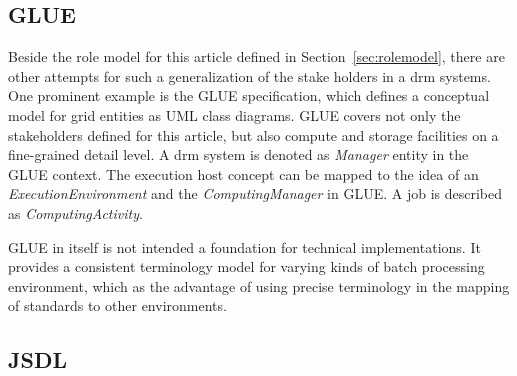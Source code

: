 \documentclass[twocolumn]{svjour3}       %
\begin{document}

% 
%
%



\subsection{GLUE}

Beside the role model for this article defined in Section~\ref{sec:rolemodel}, there are other attempts for such a generalization of the stake holders in a \gls{drm} systems. One prominent example is the GLUE specification, which defines a conceptual model for grid entities as UML class diagrams. GLUE covers not only the stakeholders defined for this article, but also compute and storage facilities on a fine-grained detail level. A \gls{drm} system is denoted as \emph{Manager} entity in the GLUE context. The execution host concept can be mapped to the idea of an \emph{ExecutionEnvironment} and the \emph{ComputingManager} in GLUE. A job is described as \emph{ComputingActivity}.


GLUE in itself is not intended a foundation for technical implementations. It provides a consistent terminology model for varying kinds of batch processing environment, which as the advantage of using precise terminology in the mapping of standards to other environments. 

\subsection{JSDL}
\end{document}
